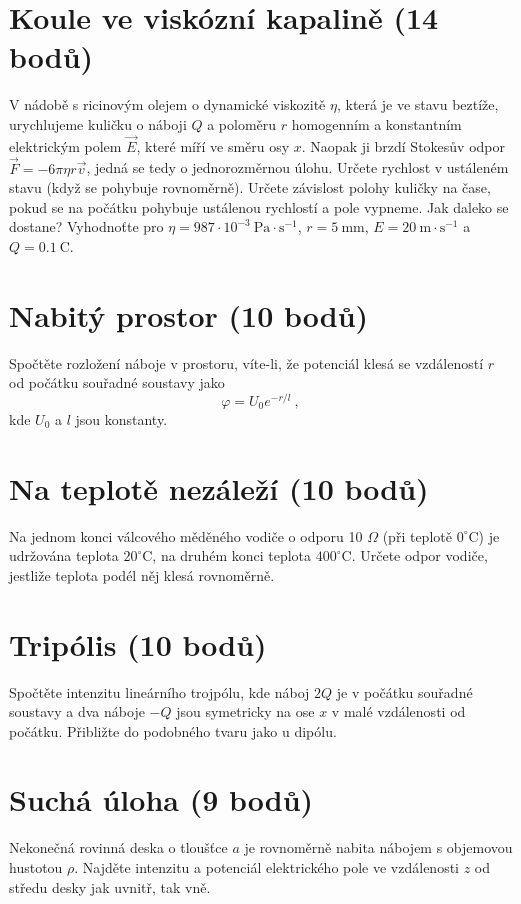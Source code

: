 \documentclass[10pt,a4paper,landscape,twocolumn]{article}
\begin{document}
\section{Koule ve viskózní kapalině (14 bodů)}
V nádobě s ricinovým olejem o dynamické viskozitě $\eta$, která je ve stavu beztíže, urychlujeme kuličku o náboji $Q$ a poloměru $r$ homogenním a konstantním elektrickým polem $\vec{E}$, které míří ve směru osy $x$. Naopak ji brzdí Stokesův odpor $\vec{F} = -6\pi\eta r\vec{v}$, jedná se tedy o jednorozměrnou úlohu. Určete rychlost v ustáleném stavu (když se pohybuje rovnoměrně). Určete závislost polohy kuličky na čase, pokud se na počátku pohybuje ustálenou rychlostí a pole vypneme. Jak daleko se dostane? Vyhodnoťte pro $\eta = 987\cdot 10^{-3}~\mathrm{Pa}\cdot\mathrm{s}^{-1}$, $r = 5~\mathrm{mm}$, $E = 20~\mathrm{m}\cdot\mathrm{s}^{-1}$ a $Q = 0.1~\mathrm{C}$.

\section{Nabitý prostor (10 bodů)}
Spočtěte rozložení náboje v prostoru, víte-li, že potenciál klesá se vzdáleností $r$ od počátku souřadné soustavy jako
\begin{equation*}
\varphi = U_0 e^{-r/l}~,
\end{equation*}
kde $U_0$ a $l$ jsou konstanty.

\section{Na teplotě nezáleží (10 bodů)}
Na jednom konci válcového měděného vodiče o odporu 10 $\Omega$ (při teplotě $0^\circ\mathrm{C}$) je udržována teplota $20^\circ\mathrm{C}$, na druhém konci teplota $400^\circ\mathrm{C}$. Určete odpor vodiče, jestliže teplota podél něj klesá rovnoměrně.

\section{Tripólis (10 bodů)}
Spočtěte intenzitu lineárního trojpólu, kde náboj $2Q$ je v počátku souřadné soustavy a dva náboje $-Q$ jsou symetricky na ose $x$ v malé vzdálenosti od počátku. Přibližte do podobného tvaru jako u dipólu.

\section{Suchá úloha (9 bodů)}
Nekonečná rovinná deska o tloušťce $a$ je rovnoměrně nabita nábojem s objemovou hustotou $\rho$. Najděte intenzitu a potenciál elektrického pole ve vzdálenosti $z$ od středu desky jak uvnitř, tak vně.
\end{document}
